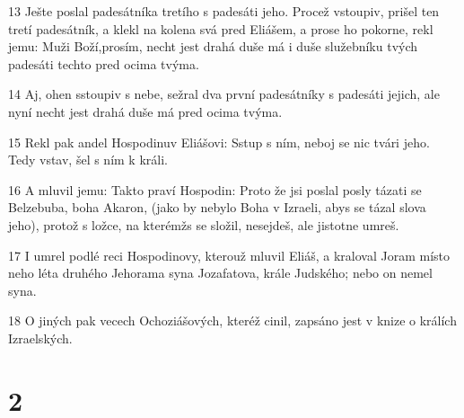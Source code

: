 \par 13 Ješte poslal padesátníka tretího s padesáti jeho. Procež vstoupiv, prišel ten tretí padesátník, a klekl na kolena svá pred Eliášem, a prose ho pokorne, rekl jemu: Muži Boží,prosím, necht jest drahá duše má i duše služebníku tvých padesáti techto pred ocima tvýma.
\par 14 Aj, ohen sstoupiv s nebe, sežral dva první padesátníky s padesáti jejich, ale nyní necht jest drahá duše má pred ocima tvýma.
\par 15 Rekl pak andel Hospodinuv Eliášovi: Sstup s ním, neboj se nic tvári jeho. Tedy vstav, šel s ním k králi.
\par 16 A mluvil jemu: Takto praví Hospodin: Proto že jsi poslal posly tázati se Belzebuba, boha Akaron, (jako by nebylo Boha v Izraeli, abys se tázal slova jeho), protož s ložce, na kterémžs se složil, nesejdeš, ale jistotne umreš.
\par 17 I umrel podlé reci Hospodinovy, kterouž mluvil Eliáš, a kraloval Joram místo neho léta druhého Jehorama syna Jozafatova, krále Judského; nebo on nemel syna.
\par 18 O jiných pak vecech Ochoziášových, kteréž cinil, zapsáno jest v knize o králích Izraelských.

\chapter{2}

